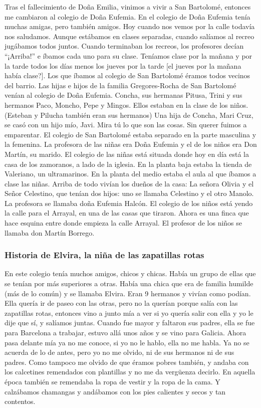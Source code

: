 \documentclass[12pt,a5paper]{book}
\begin{document}
Tras el fallecimiento de Doña Emilia, vinimos a vivir a San Bartolomé, entonces me cambiaron al colegio de Doña Eufemia. 
En el colegio de Doña Eufemia tenía muchas amigas, pero también amigos. Hoy cuando nos vemos por la calle todavía nos saludamos. Aunque estábamos en clases separadas, cuando salíamos al recreo jugábamos todos juntos. Cuando terminaban los recreos, los profesores decían “¡Arriba!” e íbamos cada uno para su clase. 
Teníamos clase por la mañana y por la tarde todos los días menos los jueves por la tarde [el jueves por la mañana había clase?]. Los que íbamos al colegio de San Bartolomé éramos todos vecinos del barrio.
Las hijas e hijos de la familia Gregores-Rocha de San Bartolomé venían al colegio de Doña Eufemia. Concha, sus hermanas Pitusa, Trini y sus hermanos Paco, Moncho, Pepe y Mingos. Ellos estaban en la clase de los niños. (Esteban y Pilucha también eran sus hermanos)
Una hija de Concha, Mari Cruz, se casó con un hijo mío, Javi. Mira tú lo que son las cosas. Sin querer fuimos a emparentar.
El colegio de San Bartolomé estaba separado en la parte masculina y la femenina. La profesora de las niñas era Doña Eufemia y el de los niños era Don Martín, su marido. 
El colegio de las niñas está situada donde hoy en día está la casa de los zamoranos, a lado de la iglesia. En la planta baja estaba la tienda de Valeriano, un ultramarinos. En la planta del medio estaba el aula al que íbamos a clase las niñas. Arriba de todo vivían los dueños de la casa: La señora Olivia y el Señor Celestino, que tenían dos hijos: uno se llamaba Celestino y el otro Manolo. La profesora se llamaba doña Eufemia Halcón.
El colegio de los niños está yendo la calle para el Arrayal, en una de las casas que tiraron. Ahora es una finca que hace esquina entre donde empieza la calle Arrayal. El profesor de los niños se llamaba don Martín Borrego.


\subsubsection*{Historia de Elvira, la niña de las zapatillas rotas}

En este colegio tenía muchos amigos, chicos y chicas. Había un grupo de ellas que se tenían por más superiores a otras. Había una chica que era de familia humilde (más de lo común) y se llamaba Elvira. Eran 9 hermanos y vivían como podían. Ella quería ir de paseo con las otras, pero no la querían porque salía con las zapatillas rotas, entonces vino a junto mía a ver si yo quería salir con ella y yo le dije que sí, y salíamos juntas.
Cuando fue mayor y faltaron sus padres, ella se fue para Barcelona a trabajar, estuvo allá unos años y se vino para Galicia. Ahora pasa delante mía ya no me conoce, si yo no le hablo, ella no me habla. Ya no se acuerda de lo de antes, pero yo no me olvido, ni de sus hermanos ni de sus padres. Como tampoco me olvido de que éramos pobres también, y andaba con los calcetines remendados con plantillas y no me da vergüenza decirlo.
En aquella época también se remendaba la ropa de vestir y la ropa de la cama. Y calzábamos chamangas y andábamos con los pies calientes y secos y tan contentos.
\end{document}
